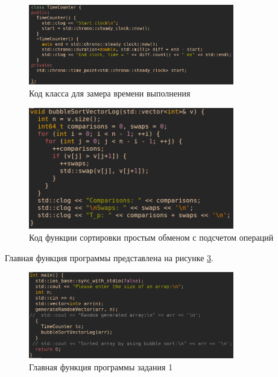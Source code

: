 \documentclass[14pt]{extarticle}
\begin{document}
\begin{figure}[htpb]
  \centering
  \includegraphics[width=0.8\textwidth]{pictures/alg1_code_timer.png}
  \caption{Код класса для замера времени выполнения}
  \label{fig:alg1_code_timer}
\end{figure}

\begin{figure}[htpb]
  \centering
  \includegraphics[width=0.8\textwidth]{pictures/alg1_code_sort_debug.png}
  \caption{Код функции сортировки простым обменом с подсчетом операций}
  \label{fig:alg1_code_sort_debug}
\end{figure}

\newpage
Главная функция программы представлена на рисунке \ref{fig:alg1_code_main}.
\begin{figure}[htpb]
  \centering
  \includegraphics[width=0.8\textwidth]{pictures/alg1_code_main.png}
  \caption{Главная функция программы задания 1}
  \label{fig:alg1_code_main}
\end{figure}
\end{document}
